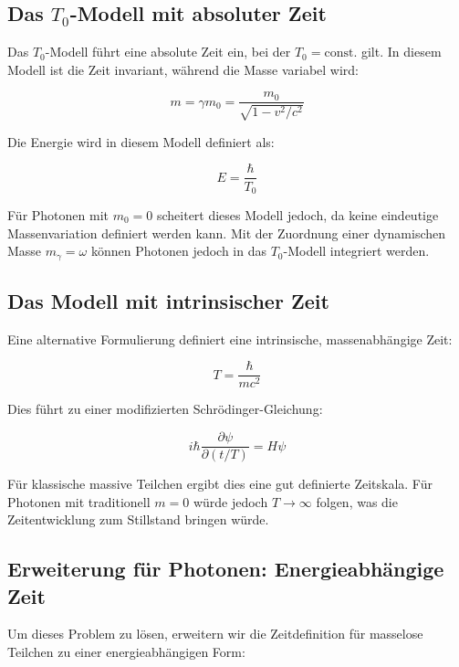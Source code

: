 \documentclass[a4paper,12pt]{article}
\begin{document}
	\subsection{Das $T_0$-Modell mit absoluter Zeit}
	Das $T_0$-Modell führt eine absolute Zeit ein, bei der $T_0 = \text{const.}$ gilt. In diesem Modell ist die Zeit invariant, während die Masse variabel wird:
	
	\begin{equation}
		m = \gamma m_0 = \frac{m_0}{\sqrt{1-v^2/c^2}}
	\end{equation}
	
	Die Energie wird in diesem Modell definiert als:
	
	\begin{equation}
		E = \frac{\hbar}{T_0}
	\end{equation}
	
	Für Photonen mit $m_0 = 0$ scheitert dieses Modell jedoch, da keine eindeutige Massenvariation definiert werden kann. Mit der Zuordnung einer dynamischen Masse $m_{\gamma} = \omega$ können Photonen jedoch in das $T_0$-Modell integriert werden.
	
	\subsection{Das Modell mit intrinsischer Zeit}
	Eine alternative Formulierung definiert eine intrinsische, massenabhängige Zeit:
	
	\begin{equation}
		T = \frac{\hbar}{mc^2}
	\end{equation}
	
	Dies führt zu einer modifizierten Schrödinger-Gleichung:
	
	\begin{equation}
		i\hbar\frac{\partial\psi}{\partial (t/T)} = H\psi
	\end{equation}
	
	Für klassische massive Teilchen ergibt dies eine gut definierte Zeitskala. Für Photonen mit traditionell $m = 0$ würde jedoch $T \rightarrow \infty$ folgen, was die Zeitentwicklung zum Stillstand bringen würde.
	
	\subsection{Erweiterung für Photonen: Energieabhängige Zeit}
	Um dieses Problem zu lösen, erweitern wir die Zeitdefinition für masselose Teilchen zu einer energieabhängigen Form:
	
\end{document}
